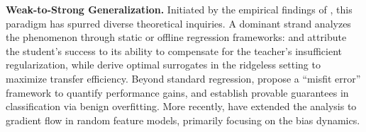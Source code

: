 \documentclass{article}
\theoremstyle{definition}
\theoremstyle{definition}
\theoremstyle{plain}
\theoremstyle{plain}
\theoremstyle{plain}
\theoremstyle{plain}
\theoremstyle{plain}
\begin{document}
\textbf{Weak-to-Strong Generalization.}
Initiated by the empirical findings of \citet{Burns2023WeaktoStrongGE}, this paradigm has spurred diverse theoretical inquiries. 
A dominant strand analyzes the phenomenon through static or offline regression frameworks: \citet{moniri2025mechanismsweaktostronggeneralizationtheoretical} and \citet{dong2025discrepanciesvirtueweaktostronggeneralization} attribute the student's success to its ability to compensate for the teacher's insufficient regularization, while \citet{ildiz2025highdimensionalanalysisknowledgedistillation} derive optimal surrogates in the ridgeless setting to maximize transfer efficiency. 
Beyond standard regression, \citet{charikar2024quantifyinggainweaktostronggeneralization} propose a ``misfit error'' framework to quantify performance gains, and \citet{Wu2024ProvableWG} establish provable guarantees in classification via benign overfitting. 
More recently, \citet{medvedev2025weaktostronggeneralizationrandomfeature} have extended the analysis to gradient flow in random feature models, primarily focusing on the bias dynamics.
\end{document}

